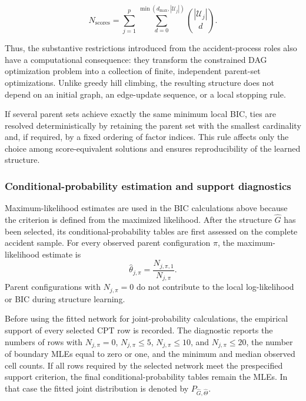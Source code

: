 \[
N_{\mathrm{scores}}
=
\sum_{j=1}^{p}
\sum_{d=0}^{\min(d_{\max},|\mathcal U_j|)}
\binom{|\mathcal U_j|}{d}.
\]

Thus, the substantive restrictions introduced from the accident-process roles
also have a computational consequence: they transform the constrained DAG
optimization problem into a collection of finite, independent parent-set
optimizations. Unlike greedy hill climbing, the resulting structure does not
depend on an initial graph, an edge-update sequence, or a local stopping rule.

If several parent sets achieve exactly the same minimum local BIC, ties are
resolved deterministically by retaining the parent set with the smallest
cardinality and, if required, by a fixed ordering of factor indices. This
rule affects only the choice among score-equivalent solutions and ensures
reproducibility of the learned structure.


\subsubsection{Conditional-probability estimation and support diagnostics}
\label{sec:chap4_global_bn_parameters}

Maximum-likelihood estimates are used in the BIC calculations above because
the criterion is defined from the maximized likelihood. After the structure
\(\widehat G\) has been selected, its conditional-probability tables are
first assessed on the complete accident sample. For every observed parent
configuration \(\pi\), the maximum-likelihood estimate is
\[
\widehat\theta_{j,\pi}
=
\frac{N_{j,\pi,1}}{N_{j,\pi}}.
\]
Parent configurations with \(N_{j,\pi}=0\) do not contribute to the local
log-likelihood or BIC during structure learning.

Before using the fitted network for joint-probability calculations, the
empirical support of every selected CPT row is recorded. The diagnostic
reports the numbers of rows with \(N_{j,\pi}=0\),
\(N_{j,\pi}\leq5\), \(N_{j,\pi}\leq10\), and \(N_{j,\pi}\leq20\), the number of boundary MLEs
equal to zero or one, and the minimum and median observed cell counts. If all
rows required by the selected network meet the prespecified support criterion,
the final conditional-probability tables remain the MLEs. In that case the
fitted joint distribution is denoted by \(P_{\widehat G,\widehat\Theta}\).

